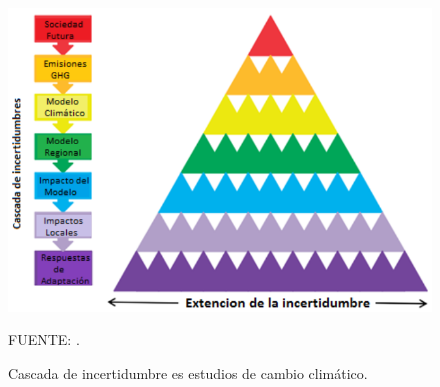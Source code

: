 \begin{figure}[t]
	\includegraphics[scale=.64]{Images/tpbu.png}
	\centering
	\caption{Cascada de incertidumbre es estudios de cambio climático.}
	{\raggedright FUENTE: \citet{Wilby2010}. \par}

    \label{fig:tpbu}
\end{figure}
